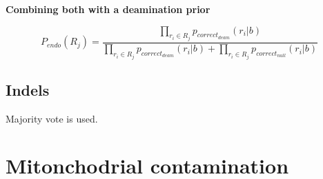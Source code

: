 \documentclass[a4paper,12pt]{article}
\begin{document}
%
%
%
%
%
%
%
%
%

{\bf Combining both with a deamination prior}


\begin{equation}
P_{endo}(R_j) = \frac { \prod\limits_{r_i \in R_j} p_{correct_{deam}}(r_i|b) } { \prod\limits_{r_i \in R_j} p_{correct_{deam}}(r_i|b) + \prod\limits_{r_i \in R_j} p_{correct_{null}}(r_i|b) }
\end{equation}



\subsection{Indels}


Majority vote is used.




\section{Mitonchodrial contamination}
\end{document}
